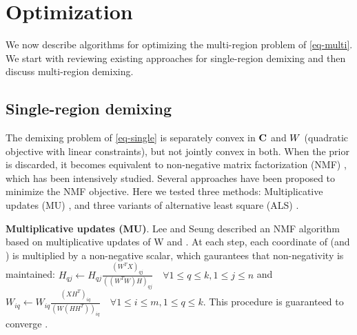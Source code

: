 \section{Optimization}
We now describe algorithms for optimizing the multi-region problem of \eqref{eq-multi}. We start with reviewing existing approaches for single-region demixing and then discuss multi-region demixing. 



\subsection{Single-region demixing}
The demixing problem of \eqref{eq-single} is separately convex in $\mathbf{C}$ and $W$ (quadratic objective with linear constraints), but not jointly convex in both. When the prior is discarded, it becomes equivalent to non-negative matrix factorization (NMF) \cite{leenmfs}, which has been intensively studied. Several approaches have been proposed to minimize the NMF objective.
%
Here we tested three methods: Multiplicative updates (MU) \cite{leenmfs}, and three variants of alternative least square (ALS) \cite{lin2007projected,kim2008activeset,kim2011fast}. 

{\bf {Multiplicative updates (MU)}}. Lee and Seung \citet{leenmfs} described an NMF algorithm based on multiplicative updates of W and \Htext. At each step, each coordinate of \Htext (and \W) is multiplied by a non-negative scalar, which gaurantees that non-negativity is maintained: $H_{qj} \leftarrow H_{qj} \frac{(W^TX)_{qj}}{((W^TW)H)_{qj}} \quad
\forall 1\leq q \leq k, 1\leq j \leq n$ and $W_{iq} \leftarrow W_{iq} \frac{(XH^T)_{iq}}{(W(HH^T))_{iq}} \quad \forall 1\leq i \leq m, 1\leq q \leq k$.
This procedure is guaranteed to converge \cite{leenmfs,lin2007convergence}. 

